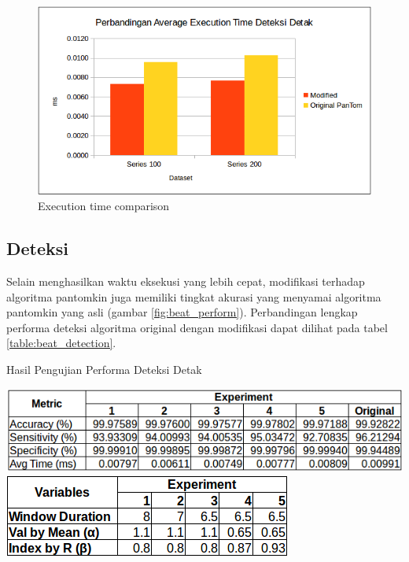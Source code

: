 \documentclass[]{indojc_single}
\begin{document}
\begin{figure}[htbp]
\centerline{\includegraphics[scale=0.41]{images/beat_exec.png}}
\caption{Execution time comparison}
\label{fig:exec_time}
\end{figure}

\subsection{Deteksi}
Selain menghasilkan waktu eksekusi yang lebih cepat, modifikasi terhadap algoritma pantomkin juga memiliki tingkat akurasi yang menyamai algoritma pantomkin yang asli (gambar \ref{fig:beat_perform}). Perbandingan lengkap performa deteksi algoritma original dengan modifikasi dapat dilihat pada tabel \ref{table:beat_detection}.

\begin{table}[H]
	\begin{center}
	\caption{Hasil Pengujian Performa Deteksi Detak}
	\includegraphics[scale=0.6]{images/beat_detection.png}	
	\includegraphics[scale=0.5]{images/experiment_variable.png}		
	\label{table:beat_detection}
	\end{center}
\end{table}
\end{document}
